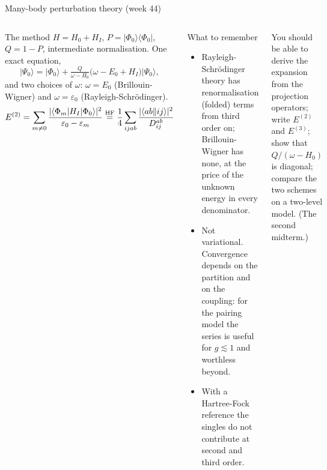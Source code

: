 \documentclass[aspectratio=169,10pt]{beamer}
\newcommand{\ket}[1]{\vert #1\rangle}
\newcommand{\bra}[1]{\langle #1\vert}
\newcommand{\mel}[3]{\langle #1\lvert #2\rvert #3\rangle}
\newcommand{\ph}{\Phi_0}
\newcommand{\as}[4]{\langle #1#2\Vert #3#4\rangle}
\begin{document}
\begin{frame}[shrink=10]{Many-body perturbation theory (week 44)}
\small
\begin{columns}[T]
\begin{block}{The method}
$H=H_0+H_I$, $P=\ket{\ph}\bra{\ph}$, $Q=1-P$, intermediate normalisation. One exact equation,
\[
 \ket{\Psi_0}=\ket{\ph}+\tfrac{Q}{\omega-H_0}\bigl(\omega-E_0+H_I\bigr)\ket{\Psi_0},
\]
and two choices of $\omega$: $\omega=E_0$ (Brillouin-Wigner) and $\omega=\varepsilon_0$ (Rayleigh-Schr\"odinger).
\[
 E^{(2)}=\sum_{m\ne0}\frac{|\mel{\Phi_m}{H_I}{\ph}|^2}{\varepsilon_0-\varepsilon_m}
 \overset{\rm HF}{=}\frac14\sum_{ijab}\frac{|\as abij|^2}{D_{ij}^{ab}}
\]
\end{block}
\begin{block}{What to remember}
\begin{itemize}
\item Rayleigh-Schr\"odinger theory has renormalisation (folded) terms from third order on; Brillouin-Wigner has none, at the price of the unknown energy in every denominator.
\item Not variational. Convergence depends on the partition and on the coupling: for the pairing model the series is useful for $g\lesssim1$ and worthless beyond.
\item With a Hartree-Fock reference the singles do not contribute at second and third order.
\end{itemize}
\end{block}
\begin{block}{You should be able to}
derive the expansion from the projection operators; write $E^{(2)}$ and $E^{(3)}$; show that $Q/(\omega-H_0)$ is diagonal; compare the two schemes on a two-level model. (The second midterm.)
\end{block}
\end{columns}
\end{frame}
\end{document}
